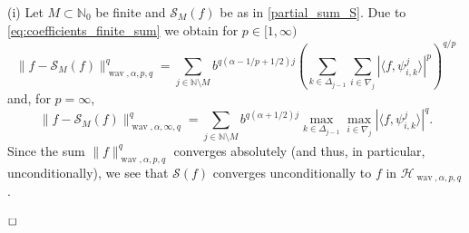 \documentclass[12pt]{article}
\DeclareMathOperator{\wav}{wav}
\newenvironment{proof}{\begin{trivlist}
    \item[\hskip\labelsep{\it Proof.}]}{$\hfill\Box$\end{trivlist}}
\newcommand{\NN}{\mathbb{N}}
\newcommand{\N}{\mathbb{N}}
\begin{document}
\begin{proof}[Proof of Lemma \ref{Rem_meaningful_1}]
(i) Let $M \subset \N_0$ be finite and $\mathcal{S}_M(f)$ be as in \eqref{partial_sum_S}.
Due to \eqref{eq:coefficients_finite_sum} we obtain for $p\in [1,\infty)$
\begin{equation*}
\| f -  \mathcal{S}_M(f)\|^q_{\wav, \alpha, p,q} = \sum_{j\in \NN\setminus M} b^{q(\alpha - 1/p +1/2)j} 
\left(  \sum_{k\in \Delta_{j-1}}
\sum_{i\in \nabla_{j}} | \langle f, \psi^{j}_{i,k} \rangle  |^p \right)^{q/p}
\end{equation*}
and, for $p=\infty$,
\begin{equation*}
\| f -  \mathcal{S}_M(f)\|^q_{\wav, \alpha, \infty, q} = \sum_{j\in \NN\setminus M} b^{q(\alpha +1/2)j} 
 \max_{k\in \Delta_{j-1}}
\max_{i\in \nabla_{j}} | \langle f, \psi^{j}_{i,k} \rangle  |^q.
\end{equation*}
Since the sum $\| f \|^q_{\wav, \alpha, p,q}$ converges absolutely (and thus, in particular, unconditionally), we see that $\mathcal{S}(f)$ converges unconditionally to $f$ in $\mathcal{H}_{\wav,\alpha,p,q}$.


\end{proof}
\end{document}
